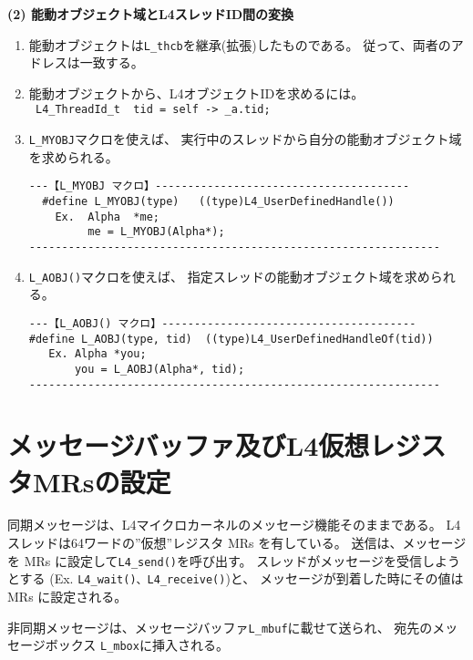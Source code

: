 {\flushleft\bf (2) 能動オブジェクト域とL4スレッドID間の変換}

\begin{enumerate}
\item  能動オブジェクトは\verb|L_thcb|を継承(拡張)したものである。
      従って、両者のアドレスは一致する。

\item  能動オブジェクトから、L4オブジェクトIDを求めるには。\\
    \verb| L4_ThreadId_t  tid = self -> _a.tid;|

\item  \verb|L_MYOBJ|マクロを使えば、
   実行中のスレッドから自分の能動オブジェクト域を求められる。
\begin{verbatim}
---【L_MYOBJ マクロ】---------------------------------------
  #define L_MYOBJ(type)   ((type)L4_UserDefinedHandle())
    Ex.  Alpha  *me;
         me = L_MYOBJ(Alpha*);
---------------------------------------------------------------
\end{verbatim}

\item  \verb|L_AOBJ()|マクロを使えば、                                                                     
   指定スレッドの能動オブジェクト域を求められる。
\begin{verbatim}
---【L_AOBJ() マクロ】---------------------------------------
#define L_AOBJ(type, tid)  ((type)L4_UserDefinedHandleOf(tid))
   Ex. Alpha *you;
       you = L_AOBJ(Alpha*, tid);
---------------------------------------------------------------
\end{verbatim}

\end{enumerate}



\section{メッセージバッファ及びL4仮想レジスタMRsの設定}

同期メッセージは、L4マイクロカーネルのメッセージ機能そのままである。
L4スレッドは64ワードの''仮想''レジスタ MRs を有している。
送信は、メッセージを MRs に設定して\verb|L4_send()|を呼び出す。
スレッドがメッセージを受信しようとする
(Ex. \verb|L4_wait()、L4_receive()|)と、
メッセージが到着した時にその値は MRs に設定される。

非同期メッセージは、メッセージバッファ\verb|L_mbuf|に載せて送られ、
宛先のメッセージボックス \verb|L_mbox|に挿入される。

